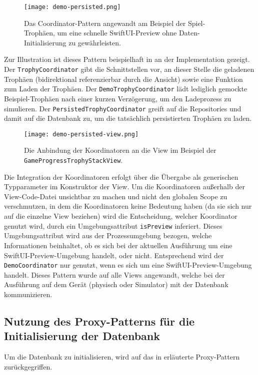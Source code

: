 \begin{figure}[H]
\texttt{[image: demo-persisted.png]}
\caption{Das Coordinator-Pattern angewandt am Beispiel der Spiel-Trophäen, um eine schnelle SwiftUI-Preview ohne Daten-Initialisierung zu gewährleisten.}\label{fig:demo-persisted}
\end{figure}

Zur Illustration ist dieses Pattern beispielhaft in  an der Implementation gezeigt. Der \texttt{TrophyCoordinator} gibt die Schnittstellen vor, an dieser Stelle die geladenen Trophäen (bidirektional referenzierbar durch die Ansicht) sowie eine Funktion zum Laden der Trophäen. Der \texttt{DemoTrophyCoordinator} lädt lediglich gemockte Beispiel-Trophäen nach einer kurzen Verzögerung, um den Ladeprozess zu simulieren. Der \texttt{PersistedTrophyCoordinator} greift auf die Repositories und damit auf die Datenbank zu, um die tatsächlich persistierten Trophäen zu laden.

\begin{figure}[H]
\texttt{[image: demo-persisted-view.png]}
\caption{Die Anbindung der Koordinatoren an die View im Beispiel der \texttt{GameProgressTrophyStackView}.}\label{fig:demo-persisted-view}
\end{figure}

Die Integration der Koordinatoren erfolgt über die Übergabe als generischen Typparameter im Konstruktor der View. Um die Koordinatoren außerhalb der View-Code-Datei unsichtbar zu machen und nicht den globalen Scope zu verschmutzen, in dem die Koordinatoren keine Bedeutung haben (da sie sich nur auf die einzelne View beziehen) wird die Entscheidung, welcher Koordinator genutzt wird, durch ein Umgebungsattribut \texttt{isPreview} inferiert. Dieses Umgebungsattribut wird aus der Prozessumgebung bezogen, welche Informationen beinhaltet, ob es sich bei der aktuellen Ausführung um eine SwiftUI-Preview-Umgebung handelt, oder nicht. Entsprechend wird der \texttt{DemoCoordinator} nur genutzt, wenn es sich um eine SwiftUI-Preview-Umgebung handelt. Dieses Pattern wurde auf alle Views angewandt, welche bei der Ausführung auf dem Gerät (physisch oder Simulator) mit der Datenbank kommunizieren.

\subsection{Nutzung des Proxy-Patterns für die Initialisierung der Datenbank}

Um die Datenbank zu initialisieren, wird auf das in  erläuterte Proxy-Pattern zurückgegriffen.

